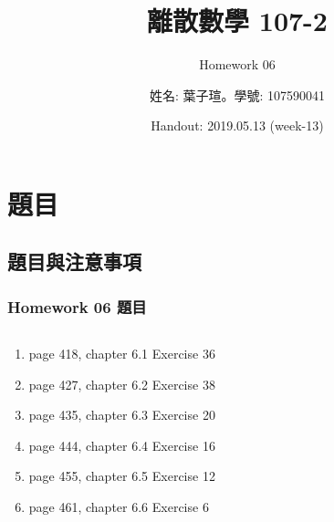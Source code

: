 \documentclass[14pt,hyperref={bookmarks=false}]{beamer}
\title{離散數學 107-2}
\subtitle{Homework 06}
\author{姓名: 葉子瑄。學號: 107590041}
\date{Handout: 2019.05.13 (week-13)}
\begin{document}

\begin{frame}
\titlepage
\end{frame}

\raggedright

\begin{frame}
\footnotesize
\tableofcontents
\end{frame}
	
\section{題目}

	\subsection{題目與注意事項}
	
	\begin{frame}
	\frametitle{Homework 06 題目}
	\fontsize{10pt}{11pt}\selectfont
	\setlength{\baselineskip}{5pt}
	\begin{columns}
	\begin{column}{0.68\textwidth}
	\begin{enumerate}[label=(Prob. \arabic*)]
	\setlength\itemsep{0em}
	\item page 418, chapter 6.1 Exercise 36
	\item page 427, chapter 6.2 Exercise 38
	\item page 435, chapter 6.3 Exercise 20
	\item page 444, chapter 6.4 Exercise 16
	\item page 455, chapter 6.5 Exercise 12
	\item page 461, chapter 6.6 Exercise 6

	\end{enumerate}
	\end{column}
	
	
	\end{columns}
	\end{frame}
	
\end{document}
